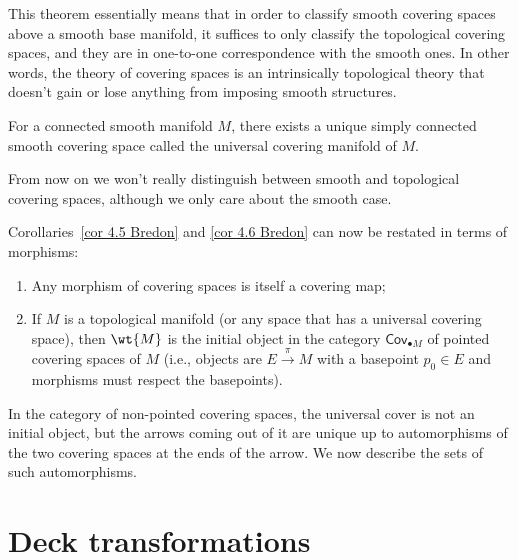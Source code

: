 This theorem essentially means that in order to classify smooth covering spaces above a smooth base manifold, it suffices to only classify the topological covering spaces, and they are in one-to-one correspondence with the smooth ones. In other words, the theory of covering spaces is an intrinsically topological theory that doesn't gain or lose anything from imposing smooth structures.

\begin{cor}
For a connected smooth manifold $M$, there exists a unique simply connected smooth covering space called the universal covering manifold of $M$.
\end{cor}
From now on we won't really distinguish between smooth and topological covering spaces, although we only care about the smooth case.

Corollaries~\ref{cor 4.5 Bredon} and \ref{cor 4.6 Bredon} can now be restated in terms of morphisms:
\begin{cor}
    \;
    \begin{enumerate}
       \item Any morphism of covering spaces is itself a covering map;
        \item If $M$ is a topological manifold (or any space that has a universal covering space), then $\wt{M}$ is the initial object in the category $\mathsf{Cov}_{\bullet M}$ of pointed covering spaces of $M$ (i.e., objects are $E\overset\pi\to M$ with a basepoint $p_0\in E$ and morphisms must respect the basepoints).
    \end{enumerate}
\end{cor}

In the category of non-pointed covering spaces, the universal cover is not an initial object, but the arrows coming out of it are unique up to automorphisms of the two covering spaces at the ends of the arrow. We now describe the sets of such automorphisms.

\section{Deck transformations}

